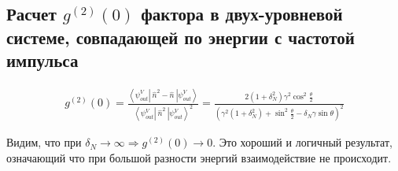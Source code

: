 \documentclass[11pt]{article}    %
\begin{document}
\subsection{Расчет $g^{(2)}(0)$ фактора в двух-уровневой системе, совпадающей по энергии с частотой импульса}

\begin{gather}
    g^{(2)}(0) = \frac{ \left< \psi_{out}^V \left| \ \hat{n}^2 - \hat{n} \ \right| \psi_{out}^V \right>}{\left< \psi_{out}^V \left| \ \hat{n}^2 \ \right| \psi_{out}^V \right> ^2 } = \frac{2 \left( 1+\delta_N^2 \right) \gamma^2 \cos^2 \frac{\theta}{2} }{\left( \gamma^2 \left( 1 + \delta_N^2 \right) + \sin^2 \frac{\theta}{2} - \delta_N \gamma \sin \theta \right)^2}
\end{gather}

Видим, что при $ \delta_N  \rightarrow \infty \Rightarrow g^{(2)}(0) \rightarrow 0 $. Это хороший и логичный результат, означающий что при большой разности энергий взаимодействие не происходит.
\end{document}
